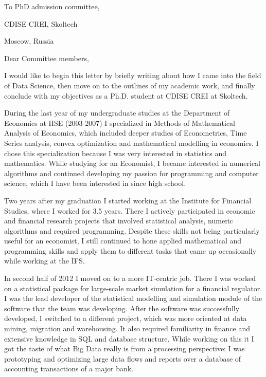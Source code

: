 \documentclass[14pt]{letter}
\begin{document}
\begin{minipage}{0.5\linewidth}
To PhD admission committee, \par
CDISE CREI, Skoltech \par
Moscow, Russia \par
\end{minipage} \par\bigskip

\hfill\par
\hfill\par

Dear Committee members, \par\bigskip

I would like to begin this letter by briefly writing about how I came into the field
of Data Science, then move on to the outlines of my academic work, and finally conclude
with my objectives as a Ph.D. student at CDISE CREI at Skoltech. \par\medskip

During the last year of my undergraduate studies at the Department of Economics at
HSE (2003-2007) I specialized in Methods of Mathematical Analysis of Economics, which
included deeper studies of Econometrics, Time Series analysis, convex optimization
and mathematical modelling in economics. I chose this specialization because I was
very interested in statistics and mathematics. While studying for an Economist, I
became interested in numerical algorithms and continued developing my passion for
programming and computer science, which I have been interested in since high school.
\par\medskip

Two years after my graduation I started working at the Institute for Financial Studies,
where I worked for 3.5 years. There I actively participated in economic and financial
research projects that involved statistical analysis, numeric algorithms and required
programming. Despite these skills not being particularly useful for an economist,
I still continued to hone applied mathematical and programming skills and apply them
to different tasks that came up occasionally while working at the IFS. \par\medskip

In second half of 2012 I moved on to a more IT-centric job. There I was worked on
a statistical package for large-scale market simulation for a financial regulator.
I was the lead developer of the statistical modelling and simulation module of the
software that the team was developing. After the software was successfully developed,
I switched to a different project, which was more oriented at data mining, migration
and warehousing. It also required familiarity in finance and extensive knowledge in
SQL and database structure. While working on this it I got the taste of what Big Data
really is from a processing perspective: I was prototyping and optimizing large data
flows and reports over a database of accounting transactions of a major bank.
\par\medskip
\end{document}
